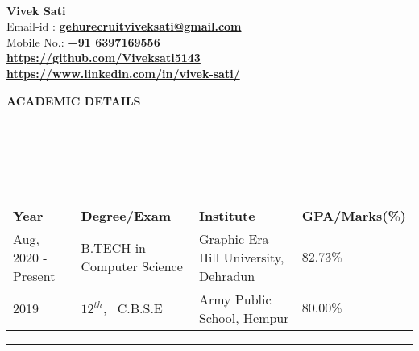 \documentclass[a4paper,10pt]{article}
\newcommand{\lsep}{-0.5cm}
\newcommand{\resheading}[1]{{\small \colorbox{mygrey}{\begin{minipage}{0.975\textwidth}{\textbf{#1 \vphantom{p\^{E}}}}\end{minipage}}}}
\begin{document}
\hspace{0.5cm}\\[-0.2cm]

\textbf{Vivek Sati} \\
\indent Email-id : \textbf{\url{gehurecruitviveksati@gmail.com}} \\
\indent Mobile No.: \textbf{+91 6397169556 } \ \\
\indent \textbf{\url{https://github.com/Viveksati5143}}\\
\indent \textbf{\url{https://www.linkedin.com/in/vivek-sati/}}\\

\resheading{\textbf{ACADEMIC DETAILS} }\\[\lsep]
\\
\indent \rule{6.8in}{0.4pt}\\
\indent \begin{tabular}{ l @{\hskip 0.15in} l @{\hskip 0.15in} l @{\hskip 0.15in} l @{\hskip 0.15in} }
\noindent \textbf{Year} & \textbf{Degree/Exam} & \textbf{Institute} & \textbf{GPA/Marks(\%)} \\
Aug, 2020 - Present & B.TECH in Computer Science & Graphic Era Hill University, Dehradun & $82.73 \%$ \\
2019 & $12^{th}$, \ C.B.S.E & Army Public School, Hempur & $80.00 \%$ \\

\end{tabular}
\indent \rule{6.8in}{0.4pt}
\\
\end{document}
